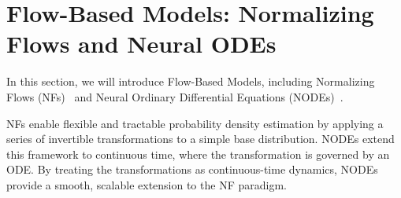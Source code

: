 \section{Flow-Based Models: Normalizing Flows and Neural ODEs}\label{sec:flow-based-method}
In this section, we will introduce Flow-Based Models, including Normalizing Flows (NFs)~\citep{rezende2015variational} and Neural Ordinary Differential Equations (NODEs)~\citep{chen2018neural}.

NFs enable flexible and tractable probability density estimation by applying a series of invertible transformations to a simple base distribution. NODEs extend this framework to continuous time, where the transformation is governed by an ODE. By treating the transformations as continuous-time dynamics, NODEs provide a smooth, scalable extension to the NF paradigm.






